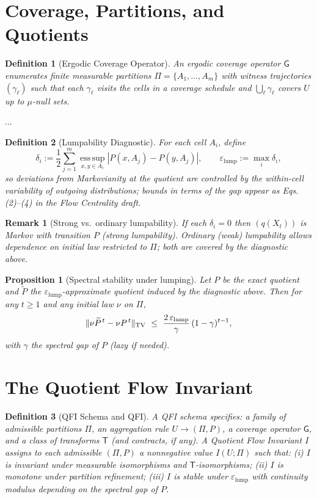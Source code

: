 \documentclass[11pt]{article}
\newcommand{\TV}{\mathrm{TV}}
\newcommand{\gap}{\gamma}             %
\newcommand{\1}{\mathbf{1}}
\DeclarePairedDelimiter{\norm}{\lVert}{\rVert}
\newtheorem{defn}{Definition}
\newtheorem{prop}{Proposition}
\newtheorem{remark}{Remark}             %
\begin{document}
\section{Coverage, Partitions, and Quotients}
\begin{defn}[Ergodic Coverage Operator]
An \emph{ergodic coverage operator} $\mathsf G$ enumerates finite measurable partitions $\Pi=\{A_1,\dots,A_m\}$ with witness trajectories $(\gamma_\ell)$ such that each $\gamma_\ell$ visits the cells in a coverage schedule and $\bigcup_\ell \gamma_\ell$ covers $U$ up to $\mu$-null sets.
\end{defn}
...
\begin{defn}[Lumpability Diagnostic]
For each cell $A_i$, define
\[
\delta_i:=\frac12\sum_{j=1}^m \operatorname*{ess\,sup}_{x,y\in A_i} \left| P(x,A_j)-P(y,A_j)\right|,\qquad \varepsilon_{\text{lump}}:=\max_i \delta_i,
\]
so deviations from Markovianity at the quotient are controlled by\cite{KemenySnell1960,Buchholz1994} the within-cell variability of outgoing distributions; bounds in terms of the gap appear as Eqs.\,(2)–(4) in the Flow Centrality draft.
\end{defn}

\begin{remark}[Strong vs.\ ordinary lumpability]
If each $\delta_i=0$ then $(q(X_t))$ is Markov with transition $P$ (strong lumpability\cite{KemenySnell1960}).
Ordinary (weak) lumpability allows dependence on initial law restricted to $\Pi$; both are covered by the diagnostic above\cite{Buchholz1994}.
\end{remark}

\begin{prop}[Spectral stability under lumping]
Let $P$ be the exact quotient and $\widetilde P$ the $\varepsilon_{\mathrm{lump}}$-approximate quotient induced by the diagnostic above.
Then for any $t\ge 1$ and any initial law $\nu$ on $\Pi$,
\[
\norm{\nu \widetilde P^{\,t}-\nu P^{\,t}}_{\TV}\ \le\ \frac{2\,\varepsilon_{\mathrm{lump}}}{\gap}\,(1-\gap)^{t-1},
\]
with $\gap$ the spectral gap of $P$ (lazy if needed)\cite{Chung1977,Mitrophanov2005}. %
\end{prop}

\section{The Quotient Flow Invariant}
\begin{defn}[QFI Schema and QFI]
A \emph{QFI schema} specifies: a family of admissible partitions $\Pi$, an aggregation rule $U\to(\Pi,P)$, a coverage operator $\mathsf G$, and a class of transforms $\mathsf T$ (and contracts, if any).
A \emph{Quotient Flow Invariant} $I$ assigns to each admissible $(\Pi,P)$ a nonnegative value $I(U;\Pi)$ such that:
(i) $I$ is invariant under measurable isomorphisms and $\mathsf T$-isomorphisms;
(ii) $I$ is monotone under partition refinement;
(iii) $I$ is stable under $\varepsilon_{\text{lump}}$ with continuity modulus depending on the spectral gap of $P$\cite{Chung1997,Dodziuk1984,JerrumSinclair1989}.
\end{defn}
\end{document}

